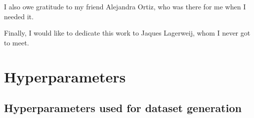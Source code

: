 \documentclass{article}
\begin{document}
I also owe gratitude to my friend Alejandra Ortiz, who was there for me when I needed it.

Finally, I would like to dedicate this work to Jaques Lagerweij,
whom I never got to meet.

\pagebreak

\nocite{*}
% 


\pagebreak

\appendix

\section{Hyperparameters} \label{sec:hpar}

\subsection{Hyperparameters used for dataset generation} \label{sec:gen-params}
\end{document}
